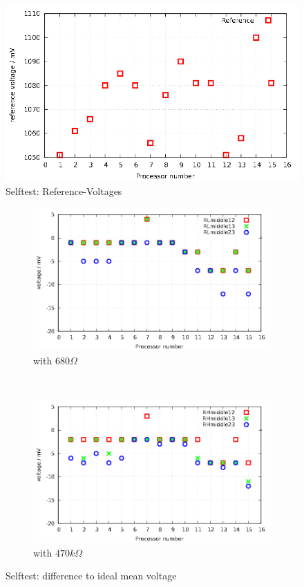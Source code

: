 \begin{figure}[H]
\centering
\includegraphics[width=.9\textwidth]{../GNU/SelfTref.pdf}
\caption{Selftest: Reference-Voltages}
\label{fig:SelfTref}
\end{figure}


\begin{figure}[H]
  \begin{subfigure}[b]{.5\textwidth}
    \centering
    \includegraphics[width=1.\textwidth]{../GNU/SelfTMitL.pdf}
    \caption{with \(680\Omega\)}
    \label{fig:SelfTMitL}
  \end{subfigure}
  ~
  \begin{subfigure}[b]{.5\textwidth}
    \centering
    \includegraphics[width=1.\textwidth]{../GNU/SelfTMitH.pdf}
    \caption{with \(470k\Omega\)}
    \label{fig:SelfTMitH}
  \end{subfigure}
  \caption{Selftest: difference to ideal mean voltage}
\end{figure}

